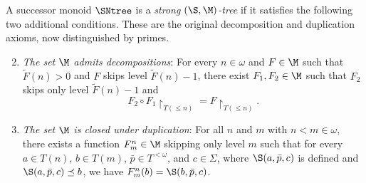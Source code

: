 \begin{definition}\label{def:sntree}
A successor monoid $\SNtree$ is a \emph{strong $(\S,\M)$-tree} if it
satisfies the following two additional conditions. These are the
original decomposition and duplication axioms, now distinguished by
primes.
\begin{enumerate}[label={(M\arabic*$'$)}]
\setcounter{enumi}{1}
		\item\label{item:Ndecomposition} \emph{The set $\M$ admits decompositions}:
			For every $n\in \omega$ and $F\in \M$ such that $\tilde{F}(n)>0$ and $F$ skips level $\tilde{F}(n)-1$,
		there exist $F_1, F_2\in \M$ such that $F_2$ skips only level $\tilde{F}(n)-1$ and $$F_2\circ F_1\restriction_{T({\leq} n)}=F\restriction_{T({\leq} n)}.$$

		\item\label{item:Nduplication} \emph{The set $\M$ is closed under duplication}: For all $n$ and $m$ with $n<m\in \omega$, there exists a function $F_m^n\in \M$
		skipping only level $m$ such that
		for every $a\in T(n)$, $b\in T(m)$, $\bar{p}\in T^{<\omega}$, and $c\in \Sigma$, where $\S(a,\bar{p},c)$ is defined and $\S(a,\bar{p},c)\preceq b$,
		we have $F^n_m(b)=\S(b,\bar{p},c)$.
\end{enumerate}
\end{definition}
